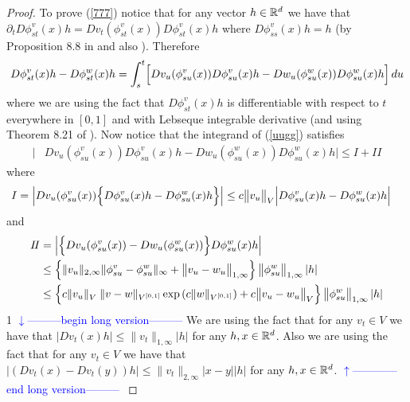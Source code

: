 \documentclass[noinfoline]{imsart}
\def\Ver{1}
\def\LongVer{1}
\begin{document}
\begin{proof}
 To prove (\ref{777}) notice that for any vector $h\in \Bbb R^d$ we have that $\partial_t D \phi_{st}^v(x)h= Dv_t (\phi_{st}^v(x))D \phi_{st}^v(x)h $ where $ D \phi_{ss}^v(x)h = h$ (by Proposition 8.8 in \cite{you:10} and also  \cite{dup:98}). Therefore
 \begin{align}
 \label{uugg}
 D \phi_{st}^v(x)h -  D \phi_{st}^w(x)h = \int_s^t \Bigl[  Dv_u (\phi_{su}^v(x))D \phi_{su}^v(x)h -  Dw_u (\phi_{su}^w(x))D \phi_{su}^w(x)h \Bigr]\,du
 \end{align}
 where we are using the fact that $D \phi_{st}^v(x)h$  is differentiable with respect to $t$ everywhere in $[0,1]$ and with  Lebseque integrable derivative   (and using Theorem 8.21 of \cite{rud:66}). 
 Now notice that the integrand of (\ref{uugg}) satisfies
  \begin{align*}
\bigl| &Dv_u (\phi_{su}^v(x))D \phi_{su}^v(x)h -  Dw_u (\phi_{su}^w(x))D \phi_{su}^w(x)h  \bigr| \leq I + I\!I
\end{align*}
where 
\begin{align*}
I &=  \left| Dv_u (\phi_{su}^v(x)) \Bigl\{ D \phi_{su}^v(x)h - D \phi_{su}^w(x)h \Bigr\}  \right| \leq   c\bigl\| v_u\bigr\|_{V} \Bigl|   D \phi_{su}^v(x)h - D \phi_{su}^w(x)h  \Bigr| 
\end{align*}
and
\begin{align*}
I\!I & =  \left|\Bigl\{ Dv_u (\phi_{su}^v(x)) -  Dw_u (\phi_{su}^w(x))  \Bigr\} D \phi_{su}^w(x)h  \right| \\
&\leq   \Bigl\{ \| v_u \|_{2,\infty} \| \phi_{su}^v - \phi_{su}^w \|_\infty   + \bigl\| v_u-w_u\bigr \|_{1,\infty} \Bigr\} \,  \bigl\| \phi_{su}^w\bigr\|_{1,\infty} \, |h |\\
&\leq \Bigl\{   c \| v_u \|_{V^{\phantom{[}}}  \|v-w\|_{V^{[0,1]}} \exp\left(c\| w \|_{V^{[0,1]}} \right)   + c\bigl\| v_u-w_u\bigr \|_{V} \Bigr\}\,  \bigl\| \phi_{su}^w\bigr\|_{1,\infty} \, |h |
 \end{align*}
\if\Ver\LongVer{ 
{\flushleft\textcolor{blue}{$\downarrow$---------begin long version---------}}\newline
We are using the fact that for any $v_t\in V$ we have that $\bigl |Dv_t (x) h \bigr |\leq \| v_t \|_{1,\infty } | h| $ for any $ h,  x \in \Bbb R^d$.  Also we are using the fact that for any $v_t\in V$ we have that $\bigl |(Dv_t (x) - Dv_t(y))h \bigr |\leq \| v_t \|_{2,\infty }|x-y| | h| $ for any $ h,  x \in \Bbb R^d$.  
  {\flushleft\textcolor{blue}{$\uparrow$------------end long version---------}}\newline
}
\end{proof}
\end{document}
